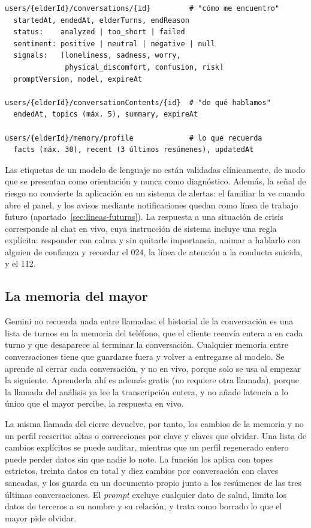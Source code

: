 \begin{lstlisting}[style=Consola, caption={Lo que se guarda de cada conversación en Firestore. La transcripción no aparece en ninguno de los documentos.}, label={lst:modelo-datos}]
users/{elderId}/conversations/{id}         # "cómo me encuentro"
  startedAt, endedAt, elderTurns, endReason
  status:    analyzed | too_short | failed
  sentiment: positive | neutral | negative | null
  signals:   [loneliness, sadness, worry,
              physical_discomfort, confusion, risk]
  promptVersion, model, expireAt

users/{elderId}/conversationContents/{id}  # "de qué hablamos"
  endedAt, topics (máx. 5), summary, expireAt

users/{elderId}/memory/profile             # lo que recuerda
  facts (máx. 30), recent (3 últimos resúmenes), updatedAt
\end{lstlisting}

Las etiquetas de un modelo de lenguaje no están validadas clínicamente, de modo que se presentan como orientación y nunca como diagnóstico. Además, la señal de riesgo no convierte la aplicación en un sistema de alertas: el familiar la ve cuando abre el panel, y los avisos mediante notificaciones quedan como línea de trabajo futuro (apartado~\ref{sec:lineas-futuras}). La respuesta a una situación de crisis corresponde al chat en vivo, cuya instrucción de sistema incluye una regla explícita: responder con calma y sin quitarle importancia, animar a hablarlo con alguien de confianza y recordar el 024, la línea de atención a la conducta suicida, y el 112.

\subsection{La memoria del mayor}

Gemini no recuerda nada entre llamadas: el historial de la conversación es una lista de turnos en la memoria del teléfono, que el cliente reenvía entera a  en cada turno y que desaparece al terminar la conversación. Cualquier memoria entre conversaciones tiene que guardarse fuera y volver a entregarse al modelo. Se aprende al cerrar cada conversación, y no en vivo, porque solo se usa al empezar la siguiente. Aprenderla ahí es además gratis (no requiere otra llamada), porque la llamada del análisis ya lee la transcripción entera, y no añade latencia a lo único que el mayor percibe, la respuesta en vivo.

La misma llamada del cierre devuelve, por tanto, los cambios de la memoria y no un perfil reescrito: altas o correcciones por clave y claves que olvidar. Una lista de cambios explícitos se puede auditar, mientras que un perfil regenerado entero puede perder datos sin que nadie lo note. La función los aplica con topes estrictos, treinta datos en total y diez cambios por conversación con claves saneadas, y los guarda en un documento propio junto a los resúmenes de las tres últimas conversaciones. El \emph{prompt} excluye cualquier dato de salud, limita los datos de terceros a su nombre y su relación, y trata como borrado lo que el mayor pide olvidar.

